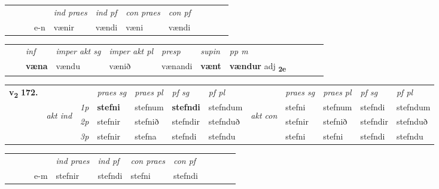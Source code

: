 \begin{tabular}{llllllllllll}
 & &  & &  \textit{ind praes} & \textit{ind pf} & \textit{con praes} & \textit{con pf} \\*
&  & & e-n & vænir & vændi & væni & vændi \\*
\cmidrule{5-9}
\end{tabular}


\begin{tabular}{llllllllllll}
 & & \textit{inf} & \textit{imper akt sg} & \textit{imper akt pl}   & \textit{presp} & \textit{supin}  & \textit{pp m}     \\*
  & & \textbf{væna} & vændu  & vænið   & vænandi &  \textbf{vænt}  & \textbf{vændur} adj \textbf{\textsubscript{2e}} \\*
\cmidrule{1-12}
\end{tabular}



\begin{tabular}{llllllllllll} \toprule
\multirow{4}{*}{{{\textbf{v{\textsubscript{2}}} \Large{\textbf{172.}}}}}  & &   &  \textit{praes sg}  & \textit{praes pl}  &\textit{ pf sg} & \textit{pf pl} &  &  \textit{praes sg}  & \textit{praes pl}  & \textit{pf sg} & \textit{pf pl } \\*
	\cmidrule{4-7} \cmidrule{9-12}
 & \multirow{3}{*}{\begin{turn}{90}\textit{akt ind}\end{turn}} & {\textit{1p}} & \textbf{stefni} & stefnum    & \textbf{stefndi} & stefndum & \multirow{3}{*}{\begin{turn}{90}\textit{akt con}\end{turn}} &stefni & stefnum & stefndi & stefndum\\*
& &  {\textit{2p}} &  stefnir  & stefnið   & stefndir & stefnduð & & stefnir & stefnið & stefndir & stefnduð \\*
& &  {\textit{3p}} & stefnir & stefna   & stefndi & stefndu & & stefni & stefni& stefndi & stefndu  \\*
\cmidrule{4-7} \cmidrule{9-12}
\end{tabular}


\begin{tabular}{llllllllllll}
 & &  & &  \textit{ind praes} & \textit{ind pf} & \textit{con praes} & \textit{con pf} \\*
&  & & e-m & stefnir & stefndi & stefni & stefndi \\*
\cmidrule{5-9}
\end{tabular}


